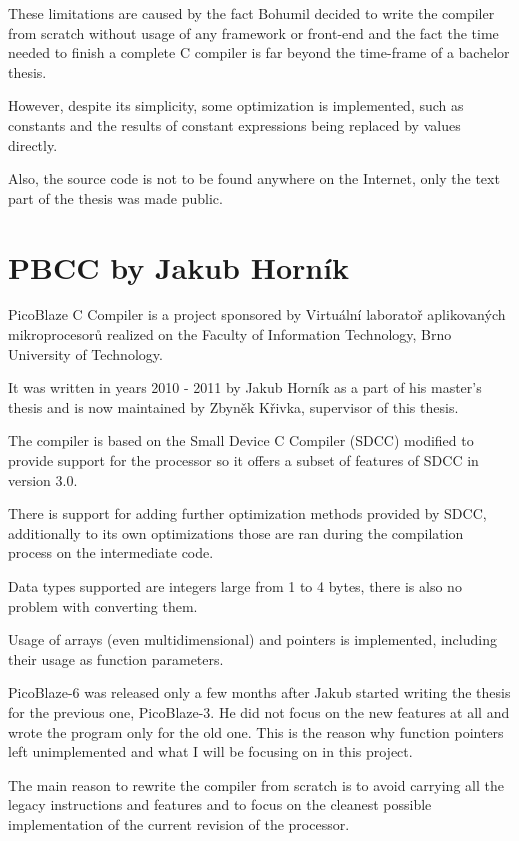     These limitations are caused by the fact Bohumil decided to write the compiler
    from scratch without usage of any framework or front-end and the fact the time needed to finish a complete C compiler is far beyond the time-frame of a bachelor thesis.

    However, despite its simplicity, some optimization is implemented, 
    such as constants and the results of constant expressions being replaced by values directly.

    Also, the source code is not to be found anywhere on the Internet, only the text part of the thesis was made public.


    \section{PBCC by Jakub Horník}\label{prev_pbcc}


    PicoBlaze C Compiler is a project sponsored by Virtuální laboratoř aplikovaných mikroprocesorů 
    realized on the Faculty of Information Technology, Brno University of Technology.

    It was written in years 2010 - 2011 by Jakub Horník as a part of his master's thesis and is now maintained by Zbyněk Křivka, supervisor of this thesis.

    The compiler is based on the Small Device C Compiler (SDCC) modified to provide support for the processor so it offers a subset of features of SDCC in version 3.0.

    There is support for adding further optimization methods provided by SDCC, additionally to its own optimizations those are ran during the compilation process on the intermediate code.

    Data types supported are integers large from 1 to 4 bytes, there is also no problem with converting them.

    Usage of arrays (even multidimensional) and pointers is implemented, including their usage as function parameters.

    PicoBlaze-6 was released only a few months after Jakub started writing the thesis for the previous one, PicoBlaze-3. 
    He did not focus on the new features at all and wrote the program only for the old one.
    This is the reason why function pointers left unimplemented and what I will be focusing on in this project.

    The main reason to rewrite the compiler from scratch is to avoid carrying all the legacy instructions and features and to focus on the cleanest possible implementation of the current revision of the processor.

